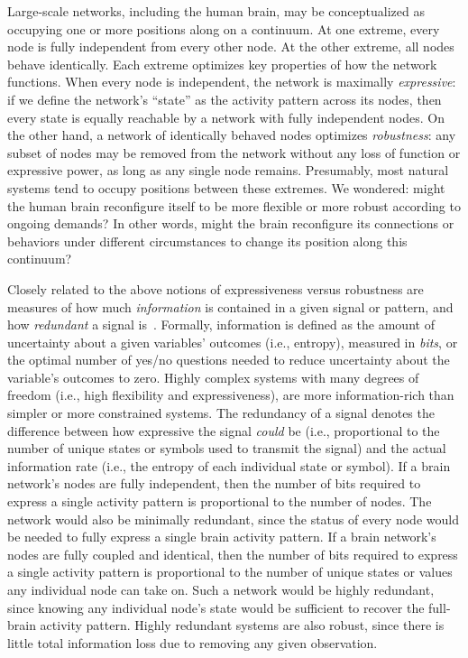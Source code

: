 \documentclass[english, 11pt]{article}
\begin{document}
Large-scale networks, including the human brain, may be conceptualized as
occupying one or more positions along on a continuum. At one extreme, every
node is fully independent from every other node. At the other extreme, all
nodes behave identically. Each extreme optimizes key properties of how the
network functions. When every node is independent, the network is maximally
\textit{expressive}: if we define the network's ``state'' as the activity
pattern across its nodes, then every state is equally reachable by a network
with fully independent nodes. On the other hand, a network of identically
behaved nodes optimizes \textit{robustness}: any subset of nodes may be removed
from the network without any loss of function or expressive power, as long as
any single node remains. Presumably, most natural systems tend to occupy
positions between these extremes. We wondered: might the human brain
reconfigure itself to be more flexible or more robust according to ongoing
demands? In other words, might the brain reconfigure its connections or
behaviors under different circumstances to change its position along this
continuum?

Closely related to the above notions of expressiveness versus robustness are
measures of how much \textit{information} is contained in a given signal or
pattern, and how \textit{redundant} a signal is~\citep{Shan48}. Formally,
information is defined as the amount of uncertainty about a given variables'
outcomes (i.e., entropy), measured in \textit{bits}, or the optimal number of
yes/no questions needed to reduce uncertainty about the variable's outcomes to
zero. Highly complex systems with many degrees of freedom (i.e., high
flexibility and expressiveness), are more information-rich than simpler or more
constrained systems. The redundancy of a signal denotes the difference between
how expressive the signal \textit{could} be (i.e., proportional to the number
of unique states or symbols used to transmit the signal) and the actual
information rate (i.e., the entropy of each individual state or symbol). If a
brain network's nodes are fully independent, then the number of bits required
to express a single activity pattern is proportional to the number of nodes.
The network would also be minimally redundant, since the status of every node
would be needed to fully express a single brain activity pattern. If a brain
network's nodes are fully coupled and identical, then the number of bits
required to express a single activity pattern is proportional to the number of
unique states or values any individual node can take on. Such a network would
be highly redundant, since knowing any individual node's state would be
sufficient to recover the full-brain activity pattern. Highly redundant systems
are also robust, since there is little total information loss due to removing
any given observation.
\end{document}
